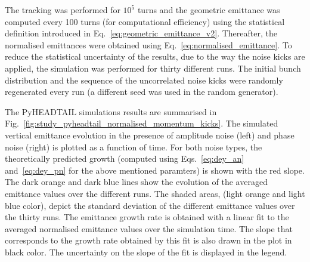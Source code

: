 The tracking was performed for $10^5$ turns and the geometric emittance was computed every 100 turns (for computational efficiency) using the statistical definition introduced in Eq.~\eqref{eq:geometric_emittance_v2}. Thereafter, the normalised emittances were obtained using Eq.~\eqref{eq:normalised_emittance}. To reduce the statistical uncertainty of the results, due to the way the noise kicks are applied, the simulation was performed for thirty different runs. The initial bunch distribution and the sequence of the uncorrelated noise kicks were randomly regenerated every run (a different seed was used in the random generator).

The PyHEADTAIL simulations results are summarised in Fig.~\ref{fig:study_pyheadtail_normalised_momentum_kicks}. The simulated vertical emittance evolution in the presence of amplitude noise (left) and phase noise (right) is plotted as a function of time. For both noise types, the theoretically predicted growth (computed using Eqs.~\eqref{eq:dey_an} and~\eqref{eq:dey_pn} for the above mentioned paramters) is shown with the red slope. The dark orange and dark blue lines show the evolution of the averaged emittance values over the different runs. The shaded areas, (light orange and light blue color), depict the standard deviation of the different emittance values over the thirty runs. The emittance growth rate is obtained with a linear fit to the averaged normalised emittance values over the simulation time. The slope that corresponds to the growth rate obtained by this fit is also drawn in the plot in black color. The uncertainty on the slope of the fit is displayed in the legend.

